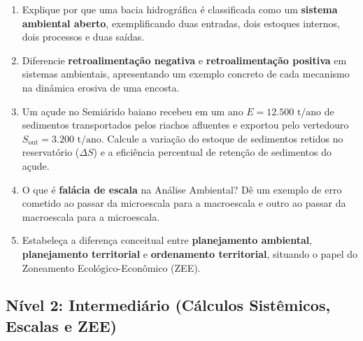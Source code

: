 \begin{enumerate}[leftmargin=1.8em, itemsep=4pt]
  \item Explique por que uma bacia hidrográfica é classificada como um \textbf{sistema ambiental aberto}, exemplificando duas entradas, dois estoques internos, dois processos e duas saídas.
  \espacoResolucao[2.0cm]

  \item Diferencie \textbf{retroalimentação negativa} e \textbf{retroalimentação positiva} em sistemas ambientais, apresentando um exemplo concreto de cada mecanismo na dinâmica erosiva de uma encosta.
  \espacoResolucao[2.0cm]

  \item Um açude no Semiárido baiano recebeu em um ano $E = 12.500\text{ t/ano}$ de sedimentos transportados pelos riachos afluentes e exportou pelo vertedouro $S_{\text{out}} = 3.200\text{ t/ano}$. Calcule a variação do estoque de sedimentos retidos no reservatório ($\Delta S$) e a eficiência percentual de retenção de sedimentos do açude.
  \espacoResolucao[2.1cm]

  \item O que é \textbf{falácia de escala} na Análise Ambiental? Dê um exemplo de erro cometido ao passar da microescala para a macroescala e outro ao passar da macroescala para a microescala.
  \espacoResolucao[2.1cm]

  \item Estabeleça a diferença conceitual entre \textbf{planejamento ambiental}, \textbf{planejamento territorial} e \textbf{ordenamento territorial}, situando o papel do Zoneamento Ecológico-Econômico (ZEE).
  \espacoResolucao[2.2cm]
\end{enumerate}

\subsection*{Nível 2: Intermediário (Cálculos Sistêmicos, Escalas e ZEE)}

